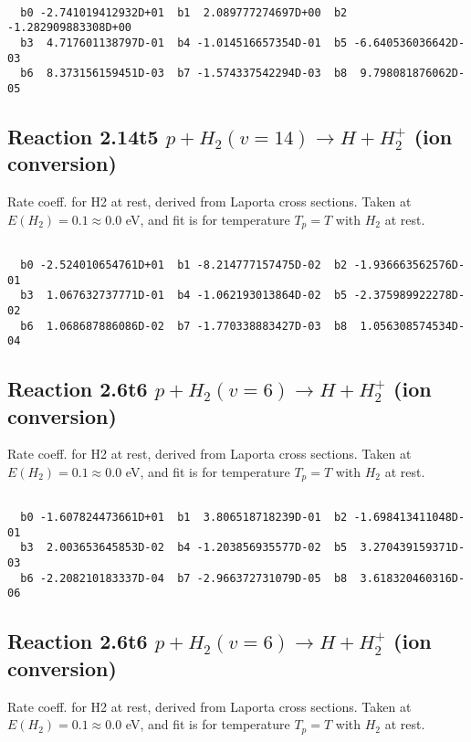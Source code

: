 \begin{small}\begin{verbatim}

  b0 -2.741019412932D+01  b1  2.089777274697D+00  b2 -1.282909883308D+00
  b3  4.717601138797D-01  b4 -1.014516657354D-01  b5 -6.640536036642D-03
  b6  8.373156159451D-03  b7 -1.574337542294D-03  b8  9.798081876062D-05

\end{verbatim}\end{small}

\newpage
\subsection{
Reaction 2.14t5
$ p + H_2(v=14) \rightarrow H + H_2^+$ (ion conversion)
}
Rate coeff. for H2 at rest, derived from Laporta cross sections.
Taken at $E(H_2) = 0.1 \approx 0.0$ eV,  and fit is for temperature $T_p=T$ with $H_2$ at rest.

\begin{small}\begin{verbatim}

  b0 -2.524010654761D+01  b1 -8.214777157475D-02  b2 -1.936663562576D-01
  b3  1.067632737771D-01  b4 -1.062193013864D-02  b5 -2.375989922278D-02
  b6  1.068687886086D-02  b7 -1.770338883427D-03  b8  1.056308574534D-04

\end{verbatim}\end{small}

\newpage
\subsection{
Reaction 2.6t6
$ p + H_2(v=6) \rightarrow H + H_2^+$ (ion conversion)
}
Rate coeff. for H2 at rest, derived from Laporta cross sections.
Taken at $E(H_2) = 0.1 \approx 0.0$ eV,  and fit is for temperature $T_p=T$ with $H_2$ at rest.

\begin{small}\begin{verbatim}

  b0 -1.607824473661D+01  b1  3.806518718239D-01  b2 -1.698413411048D-01
  b3  2.003653645853D-02  b4 -1.203856935577D-02  b5  3.270439159371D-03
  b6 -2.208210183337D-04  b7 -2.966372731079D-05  b8  3.618320460316D-06

\end{verbatim}\end{small}

\newpage
\subsection{
Reaction 2.6t6
$ p + H_2(v=6) \rightarrow H + H_2^+$ (ion conversion)
}
Rate coeff. for H2 at rest, derived from Laporta cross sections.
Taken at $E(H_2) = 0.1 \approx 0.0$ eV,  and fit is for temperature $T_p=T$ with $H_2$ at rest.

